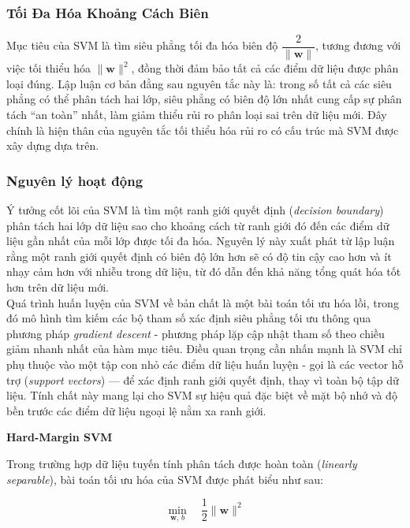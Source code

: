 \subsubsection{Tối Đa Hóa Khoảng Cách Biên}

Mục tiêu của SVM là tìm siêu phẳng tối đa hóa biên độ $\dfrac{2}{\|\mathbf{w}\|}$, tương đương với việc tối thiểu hóa $\|\mathbf{w}\|^2$, đồng thời đảm bảo tất cả các điểm dữ liệu được phân loại đúng. Lập luận cơ bản đằng sau nguyên tắc này là: trong số tất cả các siêu phẳng có thể phân tách hai lớp, siêu phẳng có biên độ lớn nhất cung cấp sự phân tách ``an toàn'' nhất, làm giảm thiểu rủi ro phân loại sai trên dữ liệu mới. Đây chính là hiện thân của nguyên tắc tối thiểu hóa rủi ro có cấu trúc mà SVM được xây dựng dựa trên.


\subsubsection{Nguyên lý hoạt động}

Ý tưởng cốt lõi của SVM là tìm một ranh giới quyết định (\textit{decision boundary}) phân tách hai lớp dữ liệu sao cho khoảng cách từ ranh giới đó đến các điểm dữ liệu gần nhất của mỗi lớp được tối đa hóa. Nguyên lý này xuất phát từ lập luận rằng một ranh giới quyết định có biên độ lớn hơn sẽ có độ tin cậy cao hơn và ít nhạy cảm hơn với nhiễu trong dữ liệu, từ đó dẫn đến khả năng tổng quát hóa tốt hơn trên dữ liệu mới.\\

Quá trình huấn luyện của SVM về bản chất là một bài toán tối ưu hóa lồi, trong đó mô hình tìm kiếm các bộ tham số xác định siêu phẳng tối ưu thông qua phương pháp \textit{gradient descent} - phương pháp lặp cập nhật tham số theo chiều giảm nhanh nhất của hàm mục tiêu. Điều quan trọng cần nhấn mạnh là SVM chỉ phụ thuộc vào một tập con nhỏ các điểm dữ liệu huấn luyện - gọi là các vector hỗ trợ (\textit{support vectors}) --- để xác định ranh giới quyết định, thay vì toàn bộ tập dữ liệu. Tính chất này mang lại cho SVM sự hiệu quả đặc biệt về mặt bộ nhớ và độ bền trước các điểm dữ liệu ngoại lệ nằm xa ranh giới.


\textbf{Hard-Margin SVM}

Trong trường hợp dữ liệu tuyến tính phân tách được hoàn toàn (\textit{linearly separable}), bài toán tối ưu hóa của SVM được phát biểu như sau:

\begin{equation}
  \min_{\mathbf{w},\, b} \quad \frac{1}{2}\|\mathbf{w}\|^2
  \label{eq:hardmargin_obj}
\end{equation}

